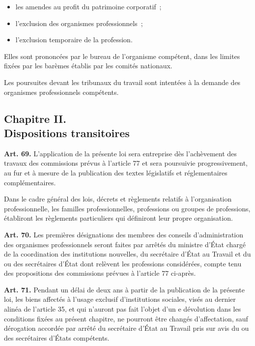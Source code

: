 \documentclass[french,twoside]{book} %
\newcommand{\labelchar}[1]{\textbf{\color{rubric} #1}}
\begin{document}
\begin{itemize}[itemsep=0pt,]
\item les amendes au profit du patrimoine corporatif ;
\item l’exclusion des organismes professionnels ;
\item l’exclusion temporaire de la profession.
\end{itemize}
\noindent Elles sont prononcées par le bureau de l’organisme compétent, dans les limites fixées par les barèmes établis par les comités nationaux.\par
Les poursuites devant les tribunaux du travail sont intentées à la demande des organismes professionnels compétents.
\subsection[Chapitre II. Dispositions transitoires]{Chapitre II. \\
Dispositions transitoires}
\noindent \labelchar{Art. 69.} L’application de la présente loi sera entreprise dès l’achèvement des travaux des commissions prévus à l’article 77 et sera poursuivie progressivement, au fur et à mesure de la publication des textes législatifs et réglementaires complémentaires.\par
Dans le cadre général des lois, décrets et règlements relatifs à l’organisation professionnelle, les familles professionnelles, professions ou groupes de professions, établiront les règlements particuliers qui définiront leur propre organisation.\par
\bigbreak
\noindent \labelchar{Art. 70.} Les premières désignations des membres des conseils d’administration des organismes professionnels seront faites par arrêtés du ministre d’État chargé de la coordination des institutions nouvelles, du secrétaire d’État au Travail et du ou des secrétaires d’État dont relèvent les professions considérées, compte tenu des propositions des commissions prévues à l’article 77 ci-après.\par
\bigbreak
\noindent \labelchar{Art. 71.} Pendant un délai de deux ans à partir de la publication de la présente loi, les biens affectés à l’usage exclusif d’institutions sociales, visés au dernier alinéa de l’article 35, et qui n’auront pas fait l’objet d’un e dévolution dans les conditions fixées au présent chapitre, ne pourront être changés d’affectation, sauf dérogation accordée par arrêté du secrétaire d’État au Travail pris sur avis du ou des secrétaires d’États compétents.\par
\end{document}
